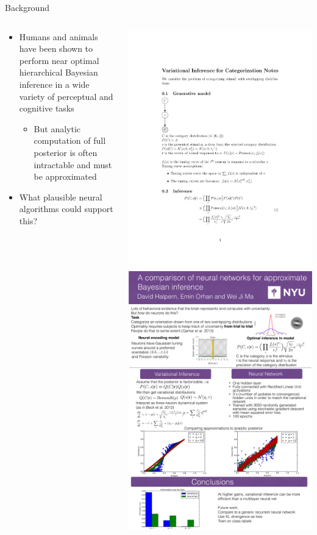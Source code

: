 \documentclass{beamer}
\begin{document}
\begin{frame}{Background}
 \begin{columns}[T]
    \begin{column}{.5\textwidth}
  	\begin{itemize}
  	\item
    	Humans and animals have been shown to perform near optimal hierarchical Bayesian inference in a wide variety of perceptual and cognitive tasks
  	\begin{itemize}
    	\item
   		But analytic computation of full posterior is often intractable and must be approximated   
   	\end{itemize}
  	\item
    	What plausible neural algorithms could support this?
   	\end{itemize}	
    \end{column}
    \begin{column}{.5\textwidth}
    	    \includegraphics[width = .2\textwidth]{GM.pdf}
   	    \includegraphics[width = .7\textwidth]{Categorization.pdf}
    \end{column}
  \end{columns}
\end{frame}
\end{document}
